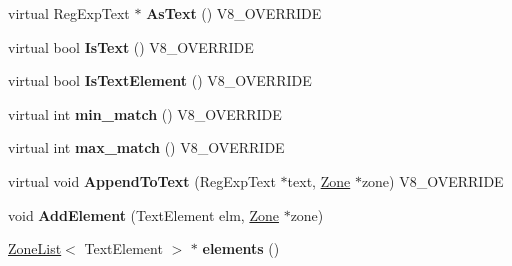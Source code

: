\begin{DoxyCompactItemize}
\item 
\hypertarget{classv8_1_1internal_1_1_v8___f_i_n_a_l_a2f6f339b1a6ecac0a276d866d0c2a201}{}virtual Reg\+Exp\+Text $\ast$ {\bfseries As\+Text} () V8\+\_\+\+O\+V\+E\+R\+R\+I\+D\+E\label{classv8_1_1internal_1_1_v8___f_i_n_a_l_a2f6f339b1a6ecac0a276d866d0c2a201}

\item 
\hypertarget{classv8_1_1internal_1_1_v8___f_i_n_a_l_a35944a462fdf966dee6184fe94b13925}{}virtual bool {\bfseries Is\+Text} () V8\+\_\+\+O\+V\+E\+R\+R\+I\+D\+E\label{classv8_1_1internal_1_1_v8___f_i_n_a_l_a35944a462fdf966dee6184fe94b13925}

\item 
\hypertarget{classv8_1_1internal_1_1_v8___f_i_n_a_l_a74df85cf747c0d931e5c99ae7831685f}{}virtual bool {\bfseries Is\+Text\+Element} () V8\+\_\+\+O\+V\+E\+R\+R\+I\+D\+E\label{classv8_1_1internal_1_1_v8___f_i_n_a_l_a74df85cf747c0d931e5c99ae7831685f}

\item 
\hypertarget{classv8_1_1internal_1_1_v8___f_i_n_a_l_ac4abdb29d336dc24ef96695ac805b1ac}{}virtual int {\bfseries min\+\_\+match} () V8\+\_\+\+O\+V\+E\+R\+R\+I\+D\+E\label{classv8_1_1internal_1_1_v8___f_i_n_a_l_ac4abdb29d336dc24ef96695ac805b1ac}

\item 
\hypertarget{classv8_1_1internal_1_1_v8___f_i_n_a_l_a0b9dd74bfd4f1172c26a072c44da8669}{}virtual int {\bfseries max\+\_\+match} () V8\+\_\+\+O\+V\+E\+R\+R\+I\+D\+E\label{classv8_1_1internal_1_1_v8___f_i_n_a_l_a0b9dd74bfd4f1172c26a072c44da8669}

\item 
\hypertarget{classv8_1_1internal_1_1_v8___f_i_n_a_l_a1f8586ff5e4b913358f02f3c88eff2e3}{}virtual void {\bfseries Append\+To\+Text} (Reg\+Exp\+Text $\ast$text, \hyperlink{classv8_1_1internal_1_1_zone}{Zone} $\ast$zone) V8\+\_\+\+O\+V\+E\+R\+R\+I\+D\+E\label{classv8_1_1internal_1_1_v8___f_i_n_a_l_a1f8586ff5e4b913358f02f3c88eff2e3}

\item 
\hypertarget{classv8_1_1internal_1_1_v8___f_i_n_a_l_a357d08bcbf9ca33c54f1261b8d8b1069}{}void {\bfseries Add\+Element} (Text\+Element elm, \hyperlink{classv8_1_1internal_1_1_zone}{Zone} $\ast$zone)\label{classv8_1_1internal_1_1_v8___f_i_n_a_l_a357d08bcbf9ca33c54f1261b8d8b1069}

\item 
\hypertarget{classv8_1_1internal_1_1_v8___f_i_n_a_l_a61e1da538725550e2f9a1e1dd87de95d}{}\hyperlink{classv8_1_1internal_1_1_zone_list}{Zone\+List}$<$ Text\+Element $>$ $\ast$ {\bfseries elements} ()\label{classv8_1_1internal_1_1_v8___f_i_n_a_l_a61e1da538725550e2f9a1e1dd87de95d}


\end{DoxyCompactItemize}
